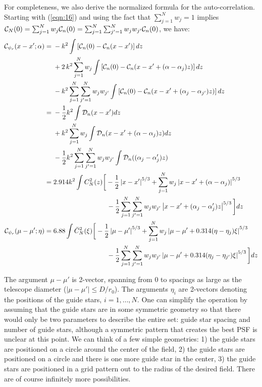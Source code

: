 \documentclass[11pt, oneside]{article}   	%
\begin{document}
For completeness, we also derive the normalized formula for the auto-correlation.  Starting with (\ref{eqn:16}) and using the fact that
$\sum_{j=1}^N w_j = 1$ implies ${\cal C}_N(0) = \sum_{j=1}^N w_j {\cal C}_n(0) = \sum_{j=1}^N \sum_{j'=1}^N w_j w_{j'} {\cal C}_n(0)$, we have:
\begin{align}
\label{eqn:variance_normalized}
{\cal C}_{\psi_r}(x-x';\alpha) =  \;& -k^2 \int \left[ {\cal C}_n(0) - {\cal C}_n(x-x') \right] dz \nonumber \\
&+ 2\,k^2 \sum_{j=1}^N w_j \int \left[ {\cal C}_n(0) - {\cal C}_n(x-x'+(\alpha-\alpha_j)z)\right] dz  \nonumber \\
&-k^2 \sum_{j=1}^N \sum_{j'=1}^N w_j w_{j'} \int \left[ {\cal C}_n(0) - {\cal C}_n(x-x'+(\alpha_j-\alpha_{j'})z)\right] dz  \nonumber \\
= \;& -\frac{1}{2} k^2 \int {\cal D}_n(x-x') dz \nonumber \\
& +k^2 \sum_{j=1}^N w_j \int {\cal D}_n(x-x'+(\alpha-\alpha_j)z) dz \nonumber \\
&-\frac{1}{2} k^2 \sum_{j=1}^N  \sum_{j'=1}^N w_j w_{j'} \int {\cal D}_n((\alpha_j-\alpha_j')z) \nonumber \\
=\;& 2.914 k^2 \int C_N^2(z) \bigg[ -\frac{1}{2} \left| x-x' \right|^{5/3}+\sum_{j=1}^N w_j \left| x-x'+(\alpha-\alpha_j) \right|^{5/3} \nonumber \\
&\qquad\qquad\qquad\qquad - \frac{1}{2} \sum_{j=1}^N \sum_{j'=1}^N w_j w_{j'} \left| x-x'+(\alpha_j - \alpha_j')z \right|^{5/3} \bigg] dz \nonumber \\
{\cal C}_{\psi_r}(\mu-\mu';\eta)=\;& 6.88 \int {\bar C}_N^2(\xi) \bigg [ -\frac{1}{2}\left| \mu-\mu'\right|^{5/3} +\sum_{j=1}^N w_j \left| \mu-\mu'+0.314(\eta-\eta_j)\xi \right|^{5/3} \nonumber \\
&\qquad\qquad\qquad\qquad - \frac{1}{2}  \sum_{j=1}^N \sum_{j'=1}^N w_j w_{j'} \left| \mu-\mu'+0.314(\eta_j - \eta_{j'})\xi \right|^{5/3} \bigg] dz
\end{align}

The argument $\mu-\mu'$ is 2-vector, spanning from 0 to spacings as large as the telescope diameter ($\left| \mu-\mu' \right| \leq D/r_0$). The arguments $\eta_i$ are 2-vectors denoting the positions of the guide stars, $i = 1,\ldots,N$. One can simplify the operation by assuming that the guide stars are in some symmetric geometry so that there would only be two parameters to describe the entire set: guide star spacing and number of guide stars, although a symmetric pattern that creates the best PSF is unclear at this point. We can think of a few simple geometries: 1) the guide stars are positioned on a circle around the center of the field, 2) the guide stars are positioned on a circle and there is one more guide star in the center, 3) the guide stars are positioned in a grid pattern out to the radius of the desired field. There are of course infinitely more possibilities.
\end{document}
